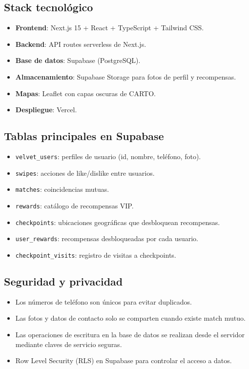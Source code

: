 \documentclass[11pt,a4paper]{article}
\begin{document}
\subsection{Stack tecnológico}

\begin{itemize}[leftmargin=*]
  \item \textbf{Frontend}: Next.js 15 + React + TypeScript + Tailwind CSS.
  \item \textbf{Backend}: API routes serverless de Next.js.
  \item \textbf{Base de datos}: Supabase (PostgreSQL).
  \item \textbf{Almacenamiento}: Supabase Storage para fotos de perfil y recompensas.
  \item \textbf{Mapas}: Leaflet con capas oscuras de CARTO.
  \item \textbf{Despliegue}: Vercel.
\end{itemize}

\subsection{Tablas principales en Supabase}

\begin{itemize}[leftmargin=*]
  \item \texttt{velvet\_users}: perfiles de usuario (id, nombre, teléfono, foto).
  \item \texttt{swipes}: acciones de like/dislike entre usuarios.
  \item \texttt{matches}: coincidencias mutuas.
  \item \texttt{rewards}: catálogo de recompensas VIP.
  \item \texttt{checkpoints}: ubicaciones geográficas que desbloquean recompensas.
  \item \texttt{user\_rewards}: recompensas desbloqueadas por cada usuario.
  \item \texttt{checkpoint\_visits}: registro de visitas a checkpoints.
\end{itemize}

\subsection{Seguridad y privacidad}

\begin{itemize}[leftmargin=*]
  \item Los números de teléfono son únicos para evitar duplicados.
  \item Las fotos y datos de contacto solo se comparten cuando existe match mutuo.
  \item Las operaciones de escritura en la base de datos se realizan desde el servidor mediante claves de servicio seguras.
  \item Row Level Security (RLS) en Supabase para controlar el acceso a datos.
\end{itemize}
\end{document}
